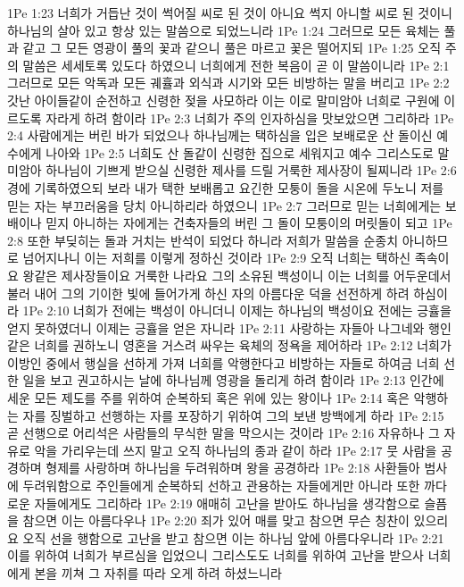 1Pe 1:23  너희가 거듭난 것이 썩어질 씨로 된 것이 아니요 썩지 아니할 씨로 된 것이니 하나님의 살아 있고 항상 있는 말씀으로 되었느니라
1Pe 1:24  그러므로 모든 육체는 풀과 같고 그 모든 영광이 풀의 꽃과 같으니 풀은 마르고 꽃은 떨어지되
1Pe 1:25  오직 주의 말씀은 세세토록 있도다 하였으니 너희에게 전한 복음이 곧 이 말씀이니라
1Pe 2:1  그러므로 모든 악독과 모든 궤휼과 외식과 시기와 모든 비방하는 말을 버리고
1Pe 2:2  갓난 아이들같이 순전하고 신령한 젖을 사모하라 이는 이로 말미암아 너희로 구원에 이르도록 자라게 하려 함이라
1Pe 2:3  너희가 주의 인자하심을 맛보았으면 그리하라
1Pe 2:4  사람에게는 버린 바가 되었으나 하나님께는 택하심을 입은 보배로운 산 돌이신 예수에게 나아와
1Pe 2:5  너희도 산 돌같이 신령한 집으로 세워지고 예수 그리스도로 말미암아 하나님이 기쁘게 받으실 신령한 제사를 드릴 거룩한 제사장이 될찌니라
1Pe 2:6  경에 기록하였으되 보라 내가 택한 보배롭고 요긴한 모퉁이 돌을 시온에 두노니 저를 믿는 자는 부끄러움을 당치 아니하리라 하였으니
1Pe 2:7  그러므로 믿는 너희에게는 보배이나 믿지 아니하는 자에게는 건축자들의 버린 그 돌이 모퉁이의 머릿돌이 되고
1Pe 2:8  또한 부딪히는 돌과 거치는 반석이 되었다 하니라 저희가 말씀을 순종치 아니하므로 넘어지나니 이는 저희를 이렇게 정하신 것이라
1Pe 2:9  오직 너희는 택하신 족속이요 왕같은 제사장들이요 거룩한 나라요 그의 소유된 백성이니 이는 너희를 어두운데서 불러 내어 그의 기이한 빛에 들어가게 하신 자의 아름다운 덕을 선전하게 하려 하심이라
1Pe 2:10  너희가 전에는 백성이 아니더니 이제는 하나님의 백성이요 전에는 긍휼을 얻지 못하였더니 이제는 긍휼을 얻은 자니라
1Pe 2:11  사랑하는 자들아 나그네와 행인같은 너희를 권하노니 영혼을 거스려 싸우는 육체의 정욕을 제어하라
1Pe 2:12  너희가 이방인 중에서 행실을 선하게 가져 너희를 악행한다고 비방하는 자들로 하여금 너희 선한 일을 보고 권고하시는 날에 하나님께 영광을 돌리게 하려 함이라
1Pe 2:13  인간에 세운 모든 제도를 주를 위하여 순복하되 혹은 위에 있는 왕이나
1Pe 2:14  혹은 악행하는 자를 징벌하고 선행하는 자를 포장하기 위하여 그의 보낸 방백에게 하라
1Pe 2:15  곧 선행으로 어리석은 사람들의 무식한 말을 막으시는 것이라
1Pe 2:16  자유하나 그 자유로 악을 가리우는데 쓰지 말고 오직 하나님의 종과 같이 하라
1Pe 2:17  뭇 사람을 공경하며 형제를 사랑하며 하나님을 두려워하며 왕을 공경하라
1Pe 2:18  사환들아 범사에 두려워함으로 주인들에게 순복하되 선하고 관용하는 자들에게만 아니라 또한 까다로운 자들에게도 그리하라
1Pe 2:19  애매히 고난을 받아도 하나님을 생각함으로 슬픔을 참으면 이는 아름다우나
1Pe 2:20  죄가 있어 매를 맞고 참으면 무슨 칭찬이 있으리요 오직 선을 행함으로 고난을 받고 참으면 이는 하나님 앞에 아름다우니라
1Pe 2:21  이를 위하여 너희가 부르심을 입었으니 그리스도도 너희를 위하여 고난을 받으사 너희에게 본을 끼쳐 그 자취를 따라 오게 하려 하셨느니라
